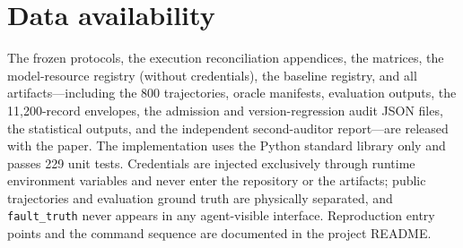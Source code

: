 \documentclass[review]{fcs}
\begin{document}
\section*{Data availability}
The frozen protocols, the execution reconciliation appendices, the matrices, the model-resource registry (without credentials), the baseline registry, and all artifacts---including the 800 trajectories, oracle manifests, evaluation outputs, the 11,200-record envelopes, the admission and version-regression audit JSON files, the statistical outputs, and the independent second-auditor report---are released with the paper. The implementation uses the Python standard library only and passes 229 unit tests. Credentials are injected exclusively through runtime environment variables and never enter the repository or the artifacts; public trajectories and evaluation ground truth are physically separated, and \texttt{fault\_truth} never appears in any agent-visible interface. Reproduction entry points and the command sequence are documented in the project README.
\end{document}
